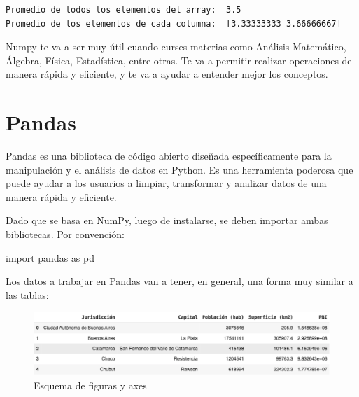 \documentclass[
  letterpaper,
  DIV=11,
  numbers=noendperiod]{scrreprt}
\newenvironment{Shaded}{\begin{snugshade}}{\end{snugshade}}
\newcommand{\ImportTok}[1]{\textcolor[rgb]{0.00,0.46,0.62}{#1}}
\newcommand{\NormalTok}[1]{\textcolor[rgb]{0.00,0.23,0.31}{#1}}
\begin{document}
\begin{verbatim}
Promedio de todos los elementos del array:  3.5
Promedio de los elementos de cada columna:  [3.33333333 3.66666667]
\end{verbatim}

\begin{tcolorbox}[enhanced jigsaw, bottomrule=.15mm, leftrule=.75mm, opacityback=0, colback=white, toprule=.15mm, bottomtitle=1mm, opacitybacktitle=0.6, rightrule=.15mm, left=2mm, arc=.35mm, coltitle=black, title=\textcolor{quarto-callout-note-color}{\faInfo}\hspace{0.5em}{Note}, breakable, toptitle=1mm, colframe=quarto-callout-note-color-frame, titlerule=0mm, colbacktitle=quarto-callout-note-color!10!white]

Numpy te va a ser muy útil cuando curses materias como Análisis
Matemático, Álgebra, Física, Estadística, entre otras. Te va a permitir
realizar operaciones de manera rápida y eficiente, y te va a ayudar a
entender mejor los conceptos.

\end{tcolorbox}

\section{Pandas}\label{pandas}

Pandas es una biblioteca de código abierto diseñada específicamente para
la manipulación y el análisis de datos en Python. Es una herramienta
poderosa que puede ayudar a los usuarios a limpiar, transformar y
analizar datos de una manera rápida y eficiente.

Dado que se basa en NumPy, luego de instalarse, se deben importar ambas
bibliotecas. Por convención:

\begin{Shaded}
\begin{Highlighting}[]
\ImportTok{import}\NormalTok{ pandas }\ImportTok{as}\NormalTok{ pd}
\end{Highlighting}
\end{Shaded}

Los datos a trabajar en Pandas van a tener, en general, una forma muy
similar a las tablas:

\begin{figure}[H]

{\centering \includegraphics{./imgs/unidad_6/pandas.png}

}

\caption{Esquema de figuras y axes}

\end{figure}%
\end{document}
